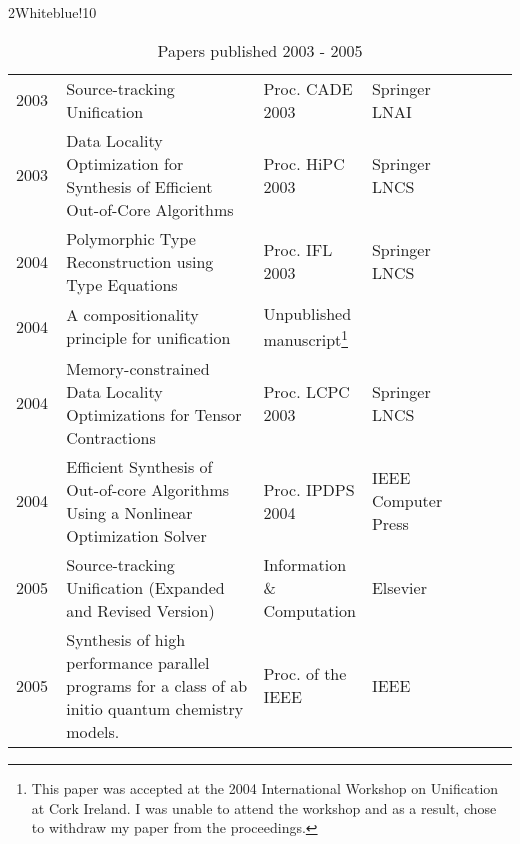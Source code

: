 \documentclass[titlepage, %
11pt, 
]{article}
\begin{document}

\begin{table}
\begin{minipage}{1.0\linewidth}
\rowcolors%
{2}{White}{blue!10}
\setlength\extrarowheight{4pt}
\begin{tabular}%
{|p{0.10\linewidth}|p{0.40\linewidth}|p{0.20\linewidth}|p{0.20\linewidth}|p{0.10\linewidth}|}
\hline
\multicolumn{1}{|m{0.10\linewidth}|}{\centering{\bf Year}}&
\multicolumn{1}{m{0.40\linewidth}|}{\centering {\bf Paper}}&
\multicolumn{1}{m{0.20\linewidth}|}{\centering {\bf Conf. or Journal}}&
\multicolumn{1}{m{0.20\linewidth}|}{\centering {\bf Publisher}}&
\multicolumn{1}{m{0.10\linewidth}|}{\centering {\bf Biblio entry}}\\
\hline
2003 & Source-tracking Unification & Proc. CADE 2003 & Springer LNAI & \cite{Choppella-Haynes-CADE-2003}\\
2003 & Data Locality Optimization for Synthesis of Efficient Out-of-Core Algorithms & Proc. HiPC 2003 & Springer LNCS & \cite{Krishnan-et-al-HiPC-2003}\\
2004 & Polymorphic Type Reconstruction using Type Equations & Proc. IFL 2003 & Springer LNCS & \cite{Choppella-IFL-2003}\\
2004 & A compositionality principle for unification & Unpublished manuscript\footnote{This paper was accepted at the 2004 International Workshop on Unification at Cork Ireland. I was unable to attend the workshop and as a result,  chose to withdraw my paper from the proceedings.} &  & \cite{Choppella-2004-compositionality}\\
2004 & Memory-constrained Data Locality Optimizations for Tensor Contractions & Proc. LCPC 2003 & Springer LNCS & \cite{Bibireata-et-al-LCPC-2004}\\
2004 & Efficient Synthesis of Out-of-core Algorithms Using a Nonlinear Optimization Solver& Proc. IPDPS 2004 & IEEE Computer Press & \cite{Krishnan-et-al-IPDPS-2004}\\
2005 & Source-tracking Unification (Expanded and Revised Version) & Information \& Computation & Elsevier & \cite{Choppella-Haynes-IAC-2005}\\
2005 & Synthesis of high performance
parallel programs for a class of ab initio quantum chemistry
models. & Proc. of the IEEE & IEEE & \cite{Baumgartner-ieee-2005}\\
\hline
\end{tabular}
\end{minipage}
\caption{Papers published  2003 - 2005\label{tbl:publications-1}}
\end{table}
\end{document}
